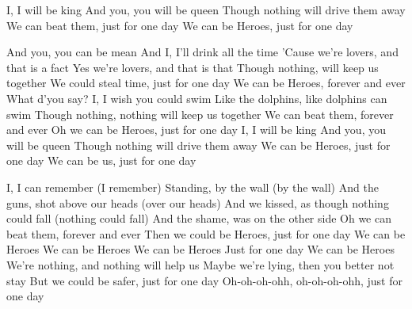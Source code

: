 

I, I will be king
And you, you will be queen
Though nothing will drive them away
We can beat them, just for one day
We can be Heroes, just for one day

And you, you can be mean
And I, I'll drink all the time
'Cause we're lovers, and that is a fact
Yes we're lovers, and that is that
Though nothing, will keep us together
We could steal time, just for one day
We can be Heroes, forever and ever
What d'you say?
I, I wish you could swim
Like the dolphins, like dolphins can swim
Though nothing, nothing will keep us together
We can beat them, forever and ever
Oh we can be Heroes, just for one day
I, I will be king
And you, you will be queen
Though nothing will drive them away
We can be Heroes, just for one day
We can be us, just for one day

I, I can remember (I remember)
Standing, by the wall (by the wall)
And the guns, shot above our heads (over our heads)
And we kissed, as though nothing could fall (nothing could fall)
And the shame, was on the other side
Oh we can beat them, forever and ever
Then we could be Heroes, just for one day
We can be Heroes
We can be Heroes
We can be Heroes
Just for one day
We can be Heroes
We're nothing, and nothing will help us
Maybe we're lying, then you better not stay
But we could be safer, just for one day
Oh-oh-oh-ohh, oh-oh-oh-ohh, just for one day 